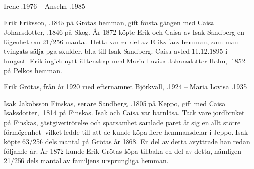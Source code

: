 Irene .1976  --  Anselm .1985


Erik Eriksson, .1845 på Grötas hemman, gift första gången med Caisa Johansdotter, .1846 på Skog. År 1872 köpte Erik och Caisa av Isak Sandberg en lägenhet om 21/256 mantal. Detta var en del av  Eriks fars hemman, som man tvingats sälja pga  skulder, bl.a till Isak Sandberg. Caisa avled 11.12.1895 i lungsot. Erik ingick nytt äktenskap med Maria Lovisa Johansdotter Holm, .1852 på Pelkos hemman.
\begin{jhchildren}
  \item {}
  \item {}
  \item {}
  \item {}
  \item {}
\end{jhchildren}
Erik Grötas, från år 1920 med efternamnet Björkvall, .1924  --  Maria Lovisa .1935


Isak Jakobsson Finskas, senare Sandberg, .1805 på Keppo, gift med Caisa Isaksdotter, .1814 på Finskas. Isak och Caisa var barnlösa. Tack vare jordbruket på Finskas, gästgiverirörelse och sparsamhet samlade paret åt sig en allt större förmögenhet, vilket ledde till att de kunde köpa flere hemmansdelar i Jeppo. Isak köpte 63/256 dels mantal på Grötas år 1868. En del av detta avyttrade han redan följande år. År 1872 kunde Erik Grötas köpa tillbaka en del av detta, nämligen 21/256 dels mantal av familjens ursprungliga hemman.


